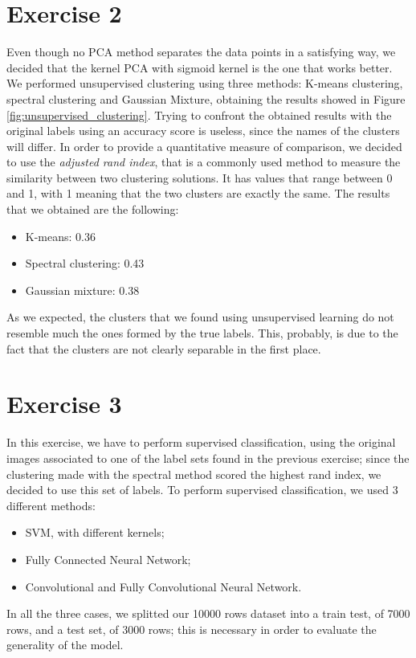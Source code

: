 \documentclass[12pt]{article}
\begin{document}
	\section*{Exercise 2}
	Even though no PCA method separates the data points in a satisfying way, we decided that the kernel PCA with sigmoid kernel is the one that works better.\newline
	We performed unsupervised clustering using three methods: K-means clustering, spectral clustering and Gaussian Mixture, obtaining the results showed in Figure \ref{fig:unsupervised_clustering}.\newline
	Trying to confront the obtained results with the original labels using an accuracy score is useless, since the names of the clusters will differ. In order to provide a quantitative measure of comparison, we decided to use the \textit{adjusted rand index}, that is a commonly used method to measure the similarity between two clustering solutions.
	It has values that range between 0 and 1, with 1 meaning that the two clusters are exactly the same.\newline
	The results that we obtained are the following:
	\begin{itemize}
		\item K-means: 0.36
		\item Spectral clustering: 0.43
		\item Gaussian mixture: 0.38
	\end{itemize}
	As we expected, the clusters that we found using unsupervised learning do not resemble much the ones formed by the true labels.\newline
	This, probably, is due to the fact that the clusters are not clearly separable in the first place.
	
	\section*{Exercise 3}
	In this exercise, we have to perform supervised classification, using the original images associated to one of the label sets found in the previous exercise; since the clustering made with the spectral method scored the highest rand index, we decided to use this set of labels.\newline
	To perform supervised classification, we used 3 different methods:
	\begin{itemize}
		\item SVM, with different kernels;
		\item Fully Connected Neural Network;
		\item Convolutional and Fully Convolutional Neural Network.
	\end{itemize}
	In all the three cases, we splitted our 10000 rows dataset into a train test, of 7000 rows, and a test set, of 3000 rows; this is necessary in order to evaluate the generality of the model.
	
\end{document}
